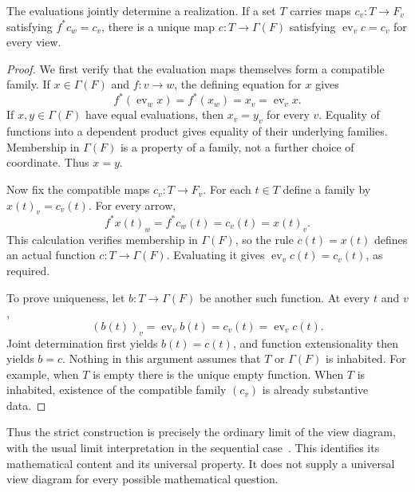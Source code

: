 \begin{KStheorem}\label{KS:KS01}
The evaluations jointly determine a realization. If a set \(T\) carries maps \(c_v:T\to F_v\) satisfying \(f^*c_w=c_v\), there is a unique map \(c:T\to\Gamma(F)\) satisfying \(\operatorname{ev}_v c=c_v\) for every view.
\end{KStheorem}
\begin{proof}
We first verify that the evaluation maps themselves form a compatible family. If $x\in\Gamma(F)$ and $f:v\to w$, the defining equation for $x$ gives
\[
 f^*(\operatorname{ev}_w x)=f^*(x_w)=x_v=\operatorname{ev}_v x.
\]
If $x,y\in\Gamma(F)$ have equal evaluations, then $x_v=y_v$ for every $v$. Equality of functions into a dependent product gives equality of their underlying families. Membership in $\Gamma(F)$ is a property of a family, not a further choice of coordinate. Thus $x=y$.

Now fix the compatible maps $c_v:T\to F_v$. For each $t\in T$ define a family by $x(t)_v=c_v(t)$. For every arrow,
\[
 f^*x(t)_w=f^*c_w(t)=c_v(t)=x(t)_v.
\]
This calculation verifies membership in $\Gamma(F)$, so the rule $c(t)=x(t)$ defines an actual function $c:T\to\Gamma(F)$. Evaluating it gives $\operatorname{ev}_vc(t)=c_v(t)$, as required.

To prove uniqueness, let $b:T\to\Gamma(F)$ be another such function. At every $t$ and $v$,
\[
 (b(t))_v=\operatorname{ev}_v b(t)=c_v(t)=\operatorname{ev}_v c(t).
\]
Joint determination first yields $b(t)=c(t)$, and function extensionality then yields $b=c$. Nothing in this argument assumes that $T$ or $\Gamma(F)$ is inhabited. For example, when $T$ is empty there is the unique empty function. When $T$ is inhabited, existence of the compatible family $(c_v)$ is already substantive data.
\end{proof}
Thus the strict construction is precisely the ordinary limit of the view diagram, with the usual limit interpretation in the sequential case~\cite{KS:stacks-limits}. This identifies its mathematical content and its universal property. It does not supply a universal view diagram for every possible mathematical question.

